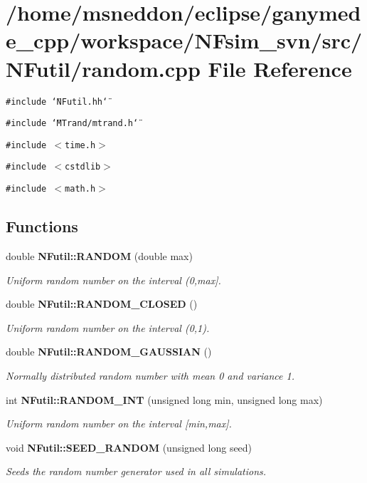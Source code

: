 \section{/home/msneddon/eclipse/ganymede\_\-cpp/workspace/NFsim\_\-svn/src/NFutil/random.cpp File Reference}
\label{random_8cpp}


{\tt \#include \char`\"{}NFutil.hh\char`\"{}}\par
{\tt \#include \char`\"{}MTrand/mtrand.h\char`\"{}}\par
{\tt \#include $<$time.h$>$}\par
{\tt \#include $<$cstdlib$>$}\par
{\tt \#include $<$math.h$>$}\par
\subsection*{Functions}
\begin{CompactItemize}
\item 
double {\bf NFutil::RANDOM} (double max)
\begin{CompactList}\small\item\em Uniform random number on the interval (0,max]. \item\end{CompactList}\item 
double {\bf NFutil::RANDOM\_\-CLOSED} ()
\begin{CompactList}\small\item\em Uniform random number on the interval (0,1). \item\end{CompactList}\item 
double {\bf NFutil::RANDOM\_\-GAUSSIAN} ()
\begin{CompactList}\small\item\em Normally distributed random number with mean 0 and variance 1. \item\end{CompactList}\item 
int {\bf NFutil::RANDOM\_\-INT} (unsigned long min, unsigned long max)
\begin{CompactList}\small\item\em Uniform random number on the interval [min,max]. \item\end{CompactList}\item 
void {\bf NFutil::SEED\_\-RANDOM} (unsigned long seed)
\begin{CompactList}\small\item\em Seeds the random number generator used in all simulations. \item\end{CompactList}\end{CompactItemize}
